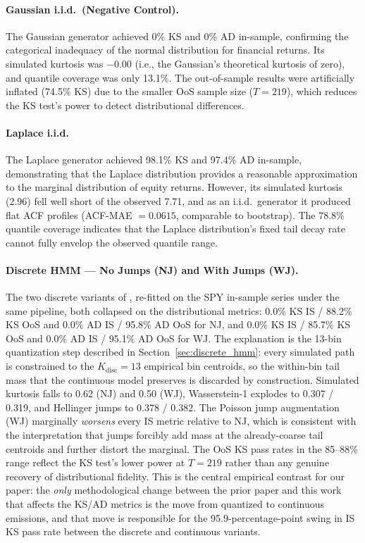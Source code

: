\paragraph{Gaussian i.i.d.\ (Negative Control).}
The Gaussian generator achieved 0\% KS and 0\% AD in-sample, confirming the categorical inadequacy of the normal distribution for financial returns.
Its simulated kurtosis was $-0.00$ (i.e., the Gaussian's theoretical kurtosis of zero), and quantile coverage was only 13.1\%.
The out-of-sample results were artificially inflated (74.5\% KS) due to the smaller OoS sample size ($T = 219$), which reduces the KS test's power to detect distributional differences.

\paragraph{Laplace i.i.d.}
The Laplace generator achieved 98.1\% KS and 97.4\% AD in-sample, demonstrating that the Laplace distribution provides a reasonable approximation to the marginal distribution of equity returns.
However, its simulated kurtosis (2.96) fell well short of the observed 7.71, and as an i.i.d.\ generator it produced flat ACF profiles (ACF-MAE $= 0.0615$, comparable to bootstrap).
The 78.8\% quantile coverage indicates that the Laplace distribution's fixed tail decay rate cannot fully envelop the observed quantile range.

\paragraph{Discrete HMM --- No Jumps (NJ) and With Jumps (WJ).}
The two discrete variants of \citet{alswaidan2026hybrid}, re-fitted on the SPY in-sample series under the same pipeline, both collapsed on the distributional metrics: 0.0\% KS IS / 88.2\% KS OoS and 0.0\% AD IS / 95.8\% AD OoS for NJ, and 0.0\% KS IS / 85.7\% KS OoS and 0.0\% AD IS / 95.1\% AD OoS for WJ.
The explanation is the 13-bin quantization step described in Section~\ref{sec:discrete_hmm}: every simulated path is constrained to the $K_{\text{disc}} = 13$ empirical bin centroids, so the within-bin tail mass that the continuous model preserves is discarded by construction.
Simulated kurtosis falls to 0.62 (NJ) and 0.50 (WJ), Wasserstein-1 explodes to 0.307 / 0.319, and Hellinger jumps to 0.378 / 0.382.
The Poisson jump augmentation (WJ) marginally \emph{worsens} every IS metric relative to NJ, which is consistent with the interpretation that jumps forcibly add mass at the already-coarse tail centroids and further distort the marginal.
The OoS KS pass rates in the 85--88\% range reflect the KS test's lower power at $T = 219$ rather than any genuine recovery of distributional fidelity.
This is the central empirical contrast for our paper: the \emph{only} methodological change between the prior paper and this work that affects the KS/AD metrics is the move from quantized to continuous emissions, and that move is responsible for the 95.9-percentage-point swing in IS KS pass rate between the discrete and continuous variants.

